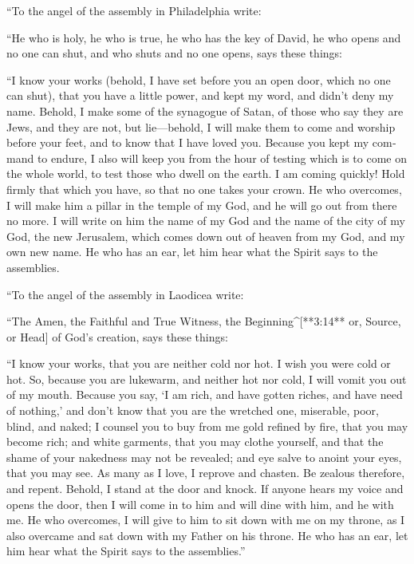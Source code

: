 \begin{paracols}{2}
\begin{english}
 “To the angel of the assembly in Philadelphia write: 

“He who is holy, he who is true, he who has the key of David, he who opens and no one can shut, and who shuts and no one opens, says these things: 

 “I know your works (behold, I have set before you an open door, which no one can shut), that you have a little power, and kept my word, and didn’t deny my name.  Behold, I make some of the synagogue of Satan, of those who say they are Jews, and they are not, but lie—behold, I will make them to come and worship before your feet, and to know that I have loved you.  Because you kept my command to endure, I also will keep you from the hour of testing which is to come on the whole world, to test those who dwell on the earth.  I am coming quickly! Hold firmly that which you have, so that no one takes your crown.  He who overcomes, I will make him a pillar in the temple of my God, and he will go out from there no more. I will write on him the name of my God and the name of the city of my God, the new Jerusalem, which comes down out of heaven from my God, and my own new name.  He who has an ear, let him hear what the Spirit says to the assemblies. 

 “To the angel of the assembly in Laodicea write: 

“The Amen, the Faithful and True Witness, the Beginning^[**3:14** or, Source, or Head] of God’s creation, says these things: 

 “I know your works, that you are neither cold nor hot. I wish you were cold or hot.  So, because you are lukewarm, and neither hot nor cold, I will vomit you out of my mouth.  Because you say, ‘I am rich, and have gotten riches, and have need of nothing,’ and don’t know that you are the wretched one, miserable, poor, blind, and naked;  I counsel you to buy from me gold refined by fire, that you may become rich; and white garments, that you may clothe yourself, and that the shame of your nakedness may not be revealed; and eye salve to anoint your eyes, that you may see.  As many as I love, I reprove and chasten. Be zealous therefore, and repent.  Behold, I stand at the door and knock. If anyone hears my voice and opens the door, then I will come in to him and will dine with him, and he with me.  He who overcomes, I will give to him to sit down with me on my throne, as I also overcame and sat down with my Father on his throne.  He who has an ear, let him hear what the Spirit says to the assemblies.” 


\end{english}
\end{paracols}
